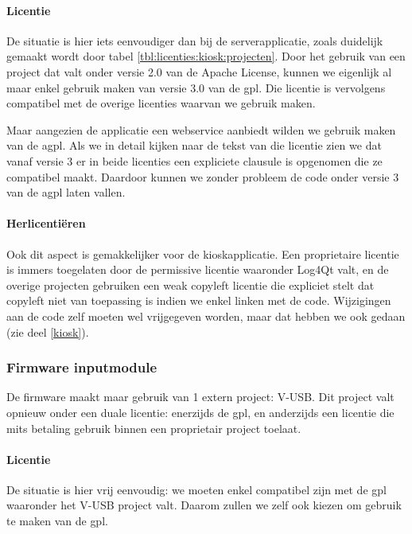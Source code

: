 \paragraph{Licentie} De situatie is hier iets eenvoudiger dan bij de serverapplicatie, zoals duidelijk gemaakt wordt door tabel \ref{tbl:licenties:kiosk:projecten}. Door het gebruik van een project dat valt onder versie 2.0 van de Apache License, kunnen we eigenlijk al maar enkel gebruik maken van versie 3.0 van de \ac{gpl}. Die licentie is vervolgens compatibel met de overige licenties waarvan we gebruik maken.

Maar aangezien de applicatie een webservice aanbiedt wilden we gebruik maken van de \ac{agpl}. Als we in detail kijken naar de tekst van die licentie zien we dat vanaf versie 3 er in beide licenties een expliciete clausule \citetext{\citealp[sectie 13]{fsf:gpl}; \citealp[sectie 13]{fsf:agpl}} is opgenomen die ze compatibel maakt. Daardoor kunnen we zonder probleem de code onder versie 3 van de \ac{agpl} laten vallen.

\paragraph{Herlicentiëren} Ook dit aspect is gemakkelijker voor de kioskapplicatie. Een proprietaire licentie is immers toegelaten door de permissive licentie waaronder Log4Qt valt, en de overige projecten gebruiken een weak copyleft licentie die expliciet stelt dat copyleft niet van toepassing is indien we enkel linken met de code. Wijzigingen aan de code zelf moeten wel vrijgegeven worden, maar dat hebben we ook gedaan (zie deel \ref{kiosk}).

\subsubsection{Firmware inputmodule}
\label{ontwerp:licenties:keuze:software:inputmodule}

De firmware maakt maar gebruik van 1 extern project: V-USB. Dit project valt opnieuw onder een duale licentie: enerzijds de \ac{gpl}, en anderzijds een licentie die mits betaling gebruik binnen een proprietair project toelaat.

\paragraph{Licentie} De situatie is hier vrij eenvoudig: we moeten enkel compatibel zijn met de \ac{gpl} waaronder het V-USB project valt. Daarom zullen we zelf ook kiezen om gebruik te maken van de \ac{gpl}.

